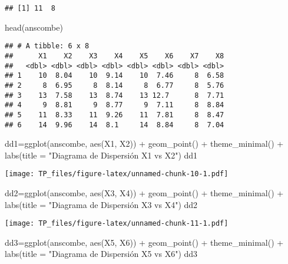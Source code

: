 \documentclass[
]{article}
\newenvironment{Shaded}{\begin{snugshade}}{\end{snugshade}}
\newcommand{\AttributeTok}[1]{\textcolor[rgb]{0.77,0.63,0.00}{#1}}
\newcommand{\FunctionTok}[1]{\textcolor[rgb]{0.00,0.00,0.00}{#1}}
\newcommand{\NormalTok}[1]{#1}
\newcommand{\OtherTok}[1]{\textcolor[rgb]{0.56,0.35,0.01}{#1}}
\newcommand{\SpecialCharTok}[1]{\textcolor[rgb]{0.00,0.00,0.00}{#1}}
\newcommand{\StringTok}[1]{\textcolor[rgb]{0.31,0.60,0.02}{#1}}
\begin{document}
\begin{verbatim}
## [1] 11  8
\end{verbatim}

\begin{Shaded}
\begin{Highlighting}[]
\FunctionTok{head}\NormalTok{(anscombe)}
\end{Highlighting}
\end{Shaded}

\begin{verbatim}
## # A tibble: 6 x 8
##      X1    X2    X3    X4    X5    X6    X7    X8
##   <dbl> <dbl> <dbl> <dbl> <dbl> <dbl> <dbl> <dbl>
## 1    10  8.04    10  9.14    10  7.46     8  6.58
## 2     8  6.95     8  8.14     8  6.77     8  5.76
## 3    13  7.58    13  8.74    13 12.7      8  7.71
## 4     9  8.81     9  8.77     9  7.11     8  8.84
## 5    11  8.33    11  9.26    11  7.81     8  8.47
## 6    14  9.96    14  8.1     14  8.84     8  7.04
\end{verbatim}

\begin{Shaded}
\begin{Highlighting}[]
\NormalTok{dd1}\OtherTok{=}\FunctionTok{ggplot}\NormalTok{(anscombe, }\FunctionTok{aes}\NormalTok{(X1, X2)) }\SpecialCharTok{+} 
  \FunctionTok{geom\_point}\NormalTok{() }\SpecialCharTok{+} \FunctionTok{theme\_minimal}\NormalTok{() }\SpecialCharTok{+} \FunctionTok{labs}\NormalTok{(}\AttributeTok{title =} \StringTok{"Diagrama de Dispersión X1 vs X2"}\NormalTok{)}
\NormalTok{dd1}
\end{Highlighting}
\end{Shaded}

\texttt{[image: TP\_files/figure-latex/unnamed-chunk-10-1.pdf]}

\begin{Shaded}
\begin{Highlighting}[]
\NormalTok{dd2}\OtherTok{=}\FunctionTok{ggplot}\NormalTok{(anscombe, }\FunctionTok{aes}\NormalTok{(X3, X4)) }\SpecialCharTok{+} 
  \FunctionTok{geom\_point}\NormalTok{() }\SpecialCharTok{+} \FunctionTok{theme\_minimal}\NormalTok{() }\SpecialCharTok{+} \FunctionTok{labs}\NormalTok{(}\AttributeTok{title =} \StringTok{"Diagrama de Dispersión X3 vs X4"}\NormalTok{)}
\NormalTok{dd2}
\end{Highlighting}
\end{Shaded}

\texttt{[image: TP\_files/figure-latex/unnamed-chunk-11-1.pdf]}

\begin{Shaded}
\begin{Highlighting}[]
\NormalTok{dd3}\OtherTok{=}\FunctionTok{ggplot}\NormalTok{(anscombe, }\FunctionTok{aes}\NormalTok{(X5, X6)) }\SpecialCharTok{+} 
  \FunctionTok{geom\_point}\NormalTok{() }\SpecialCharTok{+} \FunctionTok{theme\_minimal}\NormalTok{() }\SpecialCharTok{+} \FunctionTok{labs}\NormalTok{(}\AttributeTok{title =} \StringTok{"Diagrama de Dispersión X5 vs X6"}\NormalTok{)}
\NormalTok{dd3}
\end{Highlighting}
\end{Shaded}
\end{document}
